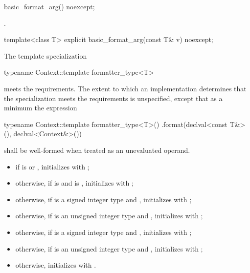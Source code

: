 %
\begin{itemdecl}
basic_format_arg() noexcept;
\end{itemdecl}

\begin{itemdescr}
\pnum
\ensures
{}.
\end{itemdescr}

\begin{itemdecl}
template<class T> explicit basic_format_arg(const T& v) noexcept;
\end{itemdecl}

\begin{itemdescr}
\pnum
\constraints
The template specialization
\begin{codeblock}
typename Context::template formatter_type<T>
\end{codeblock}
meets the  requirements.
The extent to which an implementation determines that
the specialization meets the  requirements
is unspecified,
except that as a minimum the expression
\begin{codeblock}
typename Context::template formatter_type<T>()
  .format(declval<const T&>(), declval<Context&>())
\end{codeblock}
shall be well-formed when treated as an unevaluated operand.

\pnum
\effects
\begin{itemize}
\item
if  is  or ,
initializes  with ;
\item
otherwise, if  is  and  is
, initializes  with
;
\item
otherwise, if  is a signed integer type
and ,
initializes  with ;
\item
otherwise, if  is an unsigned integer type and
, initializes
 with ;
\item
otherwise, if  is a signed integer type and
, initializes
 with ;
\item
otherwise, if  is an unsigned integer type and
, initializes
 with
;
\item
otherwise, initializes  with .
\end{itemize}
\end{itemdescr}

